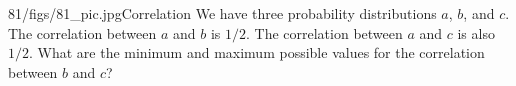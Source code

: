 \begin{problem}{81/figs/81_pic.jpg}{Correlation} We have three probability distributions $a$, $b$, and $c$. The correlation between $a$ and $b$ is $1/2$. The correlation between $a$ and $c$ is also $1/2$. What are the minimum and maximum possible values for the correlation between $b$ and $c$?
\end{problem}
